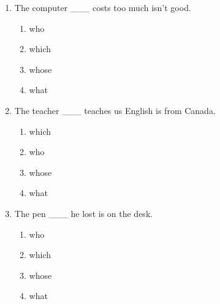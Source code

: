 \documentclass[11pt,a4paper]{ctexart}
\begin{document}
\begin{enumerate}[leftmargin=*,itemsep=4pt]
\begin{enumerate}[label=\Alph*.,leftmargin=2em,itemsep=1pt,topsep=2pt]
\item what
\end{enumerate}
\item The computer \_\_\_ costs too much isn’t good.
\begin{enumerate}[label=\Alph*.,leftmargin=2em,itemsep=1pt,topsep=2pt]
\item who
\item which
\item whose
\item what
\end{enumerate}
\item The teacher \_\_\_ teaches us English is from Canada.
\begin{enumerate}[label=\Alph*.,leftmargin=2em,itemsep=1pt,topsep=2pt]
\item which
\item who
\item whose
\item what
\end{enumerate}
\item The pen \_\_\_ he lost is on the desk.
\begin{enumerate}[label=\Alph*.,leftmargin=2em,itemsep=1pt,topsep=2pt]
\item who
\item which
\item whose
\item what
\end{enumerate}
\end{enumerate}
\end{document}

